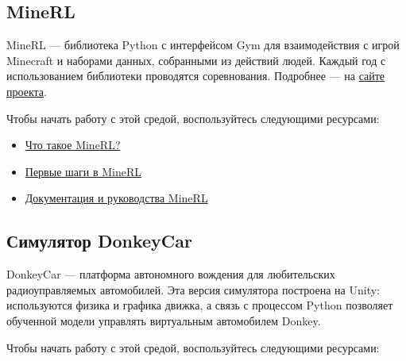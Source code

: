 \documentclass[11pt,a4paper]{article}
\begin{document}
\subsection{MineRL}\label{minerl}


MineRL --- библиотека Python с интерфейсом Gym для взаимодействия с игрой Minecraft и наборами данных, собранными из действий людей. Каждый год с использованием библиотеки проводятся соревнования. Подробнее --- на \href{https://minerl.io/}{сайте проекта}.

Чтобы начать работу с этой средой, воспользуйтесь следующими ресурсами:

\begin{itemize}
\item
  \href{https://www.youtube.com/watch?v=z6PTrGifupU}{Что такое MineRL?}
\item
  \href{https://www.youtube.com/watch?v=8yIrWcyWGek}{Первые шаги в MineRL}
\item
  \href{https://minerl.readthedocs.io/en/latest/}{Документация и руководства MineRL}
\end{itemize}

\subsection{Симулятор DonkeyCar}\label{donkeycar-simulator}


DonkeyCar --- платформа автономного вождения для любительских радиоуправляемых автомобилей. Эта версия симулятора построена на Unity: используются физика и графика движка, а связь с процессом Python позволяет обученной модели управлять виртуальным автомобилем Donkey.

Чтобы начать работу с этой средой, воспользуйтесь следующими ресурсами:
\end{document}
